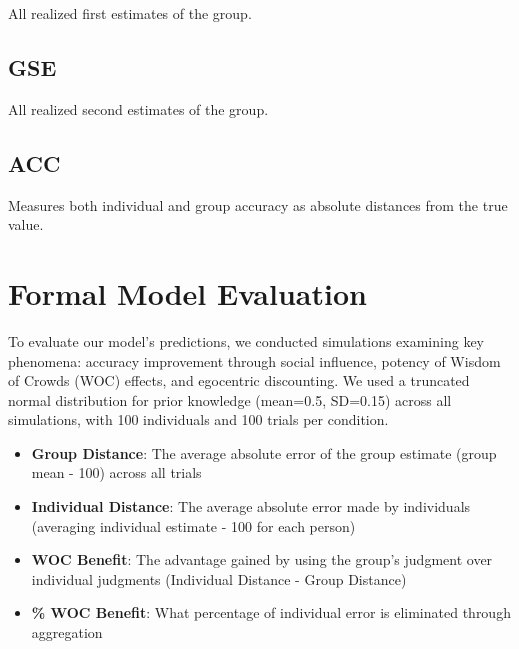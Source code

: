 \documentclass[
  man,floatsintext]{apa6}
\providecommand{\tightlist}{%
  \setlength{\itemsep}{0pt}\setlength{\parskip}{0pt}}
\begin{document}
All realized first estimates of the group.

\hypertarget{gse}{%
\subsection{GSE}\label{gse}}

All realized second estimates of the group.

\hypertarget{acc}{%
\subsection{ACC}\label{acc}}

Measures both individual and group accuracy as absolute distances from the true value.

\hypertarget{formal-model-evaluation}{%
\section{Formal Model Evaluation}\label{formal-model-evaluation}}

To evaluate our model's predictions, we conducted simulations examining key phenomena: accuracy improvement through social influence, potency of Wisdom of Crowds (WOC) effects, and egocentric discounting. We used a truncated normal distribution for prior knowledge (mean=0.5, SD=0.15) across all simulations, with 100 individuals and 100 trials per condition.

\begin{itemize}
\tightlist
\item
  \textbf{Group Distance}: The average absolute error of the group estimate (\textbar group mean - 100\textbar) across all trials
\item
  \textbf{Individual Distance}: The average absolute error made by individuals (averaging \textbar individual estimate - 100\textbar{} for each person)
\item
  \textbf{WOC Benefit}: The advantage gained by using the group's judgment over individual judgments (Individual Distance - Group Distance)
\item
  \textbf{\% WOC Benefit}: What percentage of individual error is eliminated through aggregation
\end{itemize}
\end{document}
